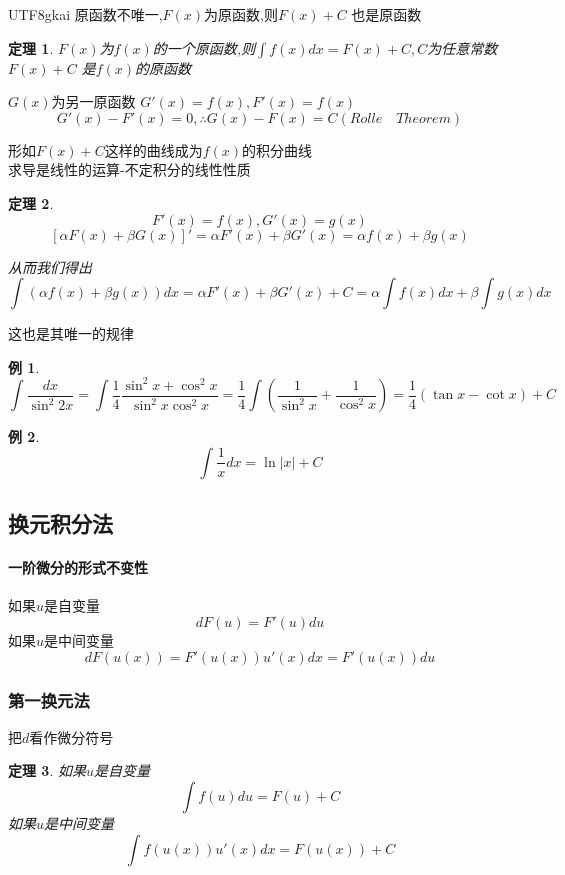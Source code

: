 \documentclass{article}
\newtheorem{theorem}{定理}[subsection]
\newtheorem{example}{例}[subsection]
\newenvironment{cproof}{%
\heiti{证明}\kaishu
}{%
}
\begin{document}
\begin{CJK}{UTF8}{gkai}
原函数不唯一,$F(x)$为原函数,则$F(x) + C$ 也是原函数

\begin{theorem}
  $F(x)$为$f(x)$的一个原函数,则$\int f(x) dx = F(x) + C,C$为任意常数
  $F(x) + C$ 是$f(x)$的原函数
\end{theorem}

\begin{cproof}
$G(x)$为另一原函数 $G'(x) = f(x), F'(x) = f(x)$\\
\[G'(x) - F'(x) = 0 ,\therefore G(x) - F(x) = C (Rolle \quad Theorem) \]

\end{cproof}
形如$F(x) + C$这样的曲线成为$f(x)$的积分曲线\\

求导是线性的运算-不定积分的线性性质\\
\begin{theorem}
  \[F'(x) = f(x) ,G'(x) = g(x)\]
  \[[\alpha F(x) + \beta G(x)]'  = \alpha F'(x) + \beta G'(x) = \alpha f(x) + \beta g(x)\]

  从而我们得出
  \[\int(\alpha f(x) + \beta g(x))dx = \alpha F'(x) + \beta G'(x) + C = \alpha \int f(x)dx + \beta \int g(x)dx\]
\end{theorem}
这也是其唯一的规律\\

\begin{example}
  \[\int \dfrac{dx}{\sin^2 2x} = \int\frac{1}{4}\dfrac{\sin^2 x+\cos^2 x}{\sin^2 x \cos^2 x} = \frac{1}{4}\int (\dfrac{1}{\sin^2 x} + \dfrac{1}{\cos^2 x} ) = \frac{1}{4}(\tan x - \cot x) + C \]
\end{example}

\begin{example}
  \[\int \frac{1}{x}dx = \ln|x| + C\]
\end{example}


\subsection{换元积分法}
\paragraph{一阶微分的形式不变性}
如果$u$是自变量
\[dF(u) =  F'(u)du\]
如果$u$是中间变量
\[dF(u(x)) = F'(u(x)) u'(x)dx = F'(u(x))du\]

\subsubsection{第一换元法}
把$d$看作微分符号\\
\begin{theorem}
  如果$u$是自变量
  \[\int f(u)du = F(u) + C\]
  如果$u$是中间变量
  \[ \int f(u(x)) u'(x)dx = F(u(x))  + C\]
\end{theorem}


\end{CJK}
\end{document}
